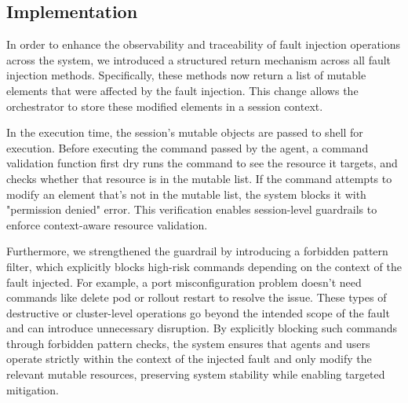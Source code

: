 


\subsection{Implementation}

In order to enhance the observability and traceability of fault injection operations across the system, we introduced a structured return mechanism across all fault injection methods. Specifically, these methods now return a list of mutable elements that were affected by the fault injection. This change allows the orchestrator to store these modified elements in a session context. 

In the execution time, the session's mutable objects are passed to shell for execution. Before executing the command passed by the agent, a command validation function first dry runs the command to see the resource it targets, and checks whether that resource is in the mutable list. If the command attempts to modify an element that's not in the mutable list, the system blocks it with "permission denied" error. This verification enables session-level guardrails to enforce context-aware resource validation. 

Furthermore, we strengthened the guardrail by introducing a forbidden pattern filter, which explicitly blocks high-risk commands depending on the context of the fault injected. For example, a port misconfiguration problem doesn't need commands like delete pod or rollout restart to resolve the issue. These types of destructive or cluster-level operations go beyond the intended scope of the fault and can introduce unnecessary disruption. By explicitly blocking such commands through forbidden pattern checks, the system ensures that agents and users operate strictly within the context of the injected fault and only modify the relevant mutable resources, preserving system stability while enabling targeted mitigation.
